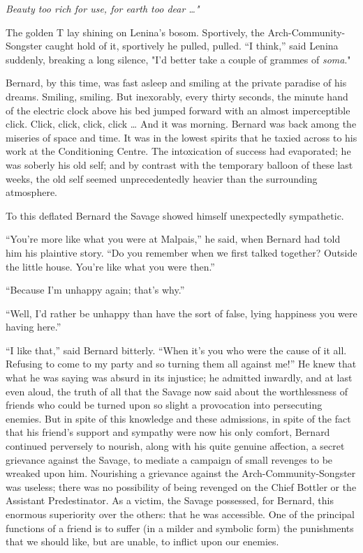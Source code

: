 \documentclass[12pt]{report}
\begin{document}
\emph{Beauty too rich for use, for earth too dear \ldots{}"\\
}

The golden T lay shining on Lenina's bosom. Sportively, the
Arch-Community-Songster caught hold of it, sportively he pulled, pulled.
``I think,'' said Lenina suddenly, breaking a long silence, "I'd better
take a couple of grammes of \emph{soma}."

Bernard, by this time, was fast asleep and smiling at the private
paradise of his dreams. Smiling, smiling. But inexorably, every thirty
seconds, the minute hand of the electric clock above his bed jumped
forward with an almost imperceptible click. Click, click, click, click
\ldots{} And it was morning. Bernard was back among the miseries of
space and time. It was in the lowest spirits that he taxied across to
his work at the Conditioning Centre. The intoxication of success had
evaporated; he was soberly his old self; and by contrast with the
temporary balloon of these last weeks, the old self seemed
unprecedentedly heavier than the surrounding atmosphere.

To this deflated Bernard the Savage showed himself unexpectedly
sympathetic.

``You're more like what you were at Malpais,'' he said, when Bernard had
told him his plaintive story. ``Do you remember when we first talked
together? Outside the little house. You're like what you were then.''

``Because I'm unhappy again; that's why.''

``Well, I'd rather be unhappy than have the sort of false, lying
happiness you were having here.''

``I like that,'' said Bernard bitterly. ``When it's you who were the
cause of it all. Refusing to come to my party and so turning them all
against me!'' He knew that what he was saying was absurd in its
injustice; he admitted inwardly, and at last even aloud, the truth of
all that the Savage now said about the worthlessness of friends who
could be turned upon so slight a provocation into persecuting enemies.
But in spite of this knowledge and these admissions, in spite of the
fact that his friend's support and sympathy were now his only comfort,
Bernard continued perversely to nourish, along with his quite genuine
affection, a secret grievance against the Savage, to mediate a campaign
of small revenges to be wreaked upon him. Nourishing a grievance against
the Arch-Community-Songster was useless; there was no possibility of
being revenged on the Chief Bottler or the Assistant Predestinator. As a
victim, the Savage possessed, for Bernard, this enormous superiority
over the others: that he was accessible. One of the principal functions
of a friend is to suffer (in a milder and symbolic form) the punishments
that we should like, but are unable, to inflict upon our enemies.
\end{document}
